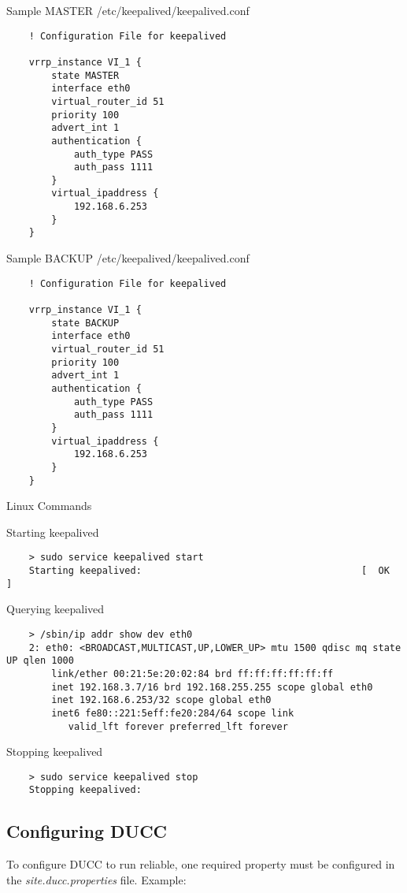 \documentclass[letterpaper]{article}
\begin{document}
	Sample MASTER /etc/keepalived/keepalived.conf
	
	\begin{verbatim}
    ! Configuration File for keepalived

	vrrp_instance VI_1 {
	    state MASTER
	    interface eth0
	    virtual_router_id 51
	    priority 100
	    advert_int 1
	    authentication {
	        auth_type PASS
	        auth_pass 1111
	    }
	    virtual_ipaddress {
	        192.168.6.253
	    }
	}
   	\end{verbatim}

	Sample BACKUP /etc/keepalived/keepalived.conf
	
	\begin{verbatim}
    ! Configuration File for keepalived

	vrrp_instance VI_1 {
	    state BACKUP
	    interface eth0
	    virtual_router_id 51
	    priority 100
	    advert_int 1
	    authentication {
	        auth_type PASS
	        auth_pass 1111
	    }
	    virtual_ipaddress {
	        192.168.6.253
	    }
	}
   	\end{verbatim}

	Linux Commands
	
	Starting keepalived
	
    \begin{verbatim}
    > sudo service keepalived start
    Starting keepalived:                                       [  OK  ]
   	\end{verbatim}
   	
   	Querying keepalived
	
    \begin{verbatim}
    > /sbin/ip addr show dev eth0
	2: eth0: <BROADCAST,MULTICAST,UP,LOWER_UP> mtu 1500 qdisc mq state UP qlen 1000
	    link/ether 00:21:5e:20:02:84 brd ff:ff:ff:ff:ff:ff
	    inet 192.168.3.7/16 brd 192.168.255.255 scope global eth0
	    inet 192.168.6.253/32 scope global eth0
	    inet6 fe80::221:5eff:fe20:284/64 scope link 
	       valid_lft forever preferred_lft forever
   	\end{verbatim}

	Stopping keepalived
	
    \begin{verbatim}
    > sudo service keepalived stop
    Stopping keepalived: 
   	\end{verbatim}

\subsection{Configuring DUCC}  
    To configure DUCC to run reliable, one required property must
    be configured in the {\em site.ducc.properties} file.  Example:
    
\end{document}
